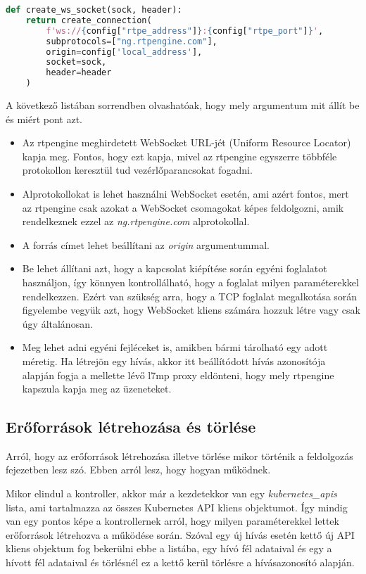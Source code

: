 \begin{lstlisting}[language=python, caption=WebSocket foglalat létrehozása, label=lst:wssock]
def create_ws_socket(sock, header):
	return create_connection(
		f'ws://{config["rtpe_address"]}:{config["rtpe_port"]}',
		subprotocols=["ng.rtpengine.com"],
		origin=config['local_address'],
		socket=sock,
		header=header
	)
\end{lstlisting}

A következő listában sorrendben olvashatóak, hogy mely argumentum mit állít be és miért
pont azt.

\begin{itemize}
	\item Az rtpengine meghirdetett WebSocket URL-jét (Uniform Resource Locator) kapja 
	meg. Fontos, hogy ezt kapja, mivel az rtpengine egyszerre többféle protokollon keresztül tud 
	vezérlőparancsokat fogadni.
	\item Alprotokollokat is lehet használni WebSocket esetén, ami azért fontos, mert
	az rtpengine csak azokat a WebSocket csomagokat képes feldolgozni, amik rendelkeznek
	ezzel az \textit{ng.rtpengine.com} alprotokollal.
	\item A forrás címet lehet beállítani az \textit{origin} argumentummal. 
	\item Be lehet állítani azt, hogy a kapcsolat kiépítése során egyéni foglalatot
	használjon, így könnyen kontrollálható, hogy a foglalat milyen paraméterekkel 
	rendelkezzen. Ezért van szükség arra, hogy a TCP foglalat megalkotása során
	figyelembe vegyük azt, hogy WebSocket kliens számára hozzuk létre vagy csak úgy
	általánosan.
	\item Meg lehet adni egyéni fejléceket is, amikben bármi tárolható egy adott
	méretig. Ha létrejön egy hívás, akkor itt beállítódott hívás azonosítója alapján
	fogja a mellette lévő l7mp proxy eldönteni, hogy mely rtpengine kapszula kapja
	meg az üzeneteket.
\end{itemize}

\subsection{Erőforrások létrehozása és törlése}

Arról, hogy az erőforrások létrehozása illetve törlése mikor történik a feldolgozás
fejezetben lesz szó. Ebben arról lesz, hogy hogyan működnek.

Mikor elindul a kontroller, akkor már a kezdetekkor van egy \textit{kubernetes\_apis}
lista, ami tartalmazza az összes Kubernetes API kliens objektumot. Így mindig van egy
pontos képe a kontrollernek arról, hogy milyen paraméterekkel lettek erőforrások 
létrehozva a működése során. Szóval egy új hívás esetén kettő új API kliens objektum 
fog bekerülni ebbe a listába, egy hívó fél adataival és egy a hívott fél adataival 
és törlésnél ez a kettő kerül törlésre a hívásazonosító alapján. 


